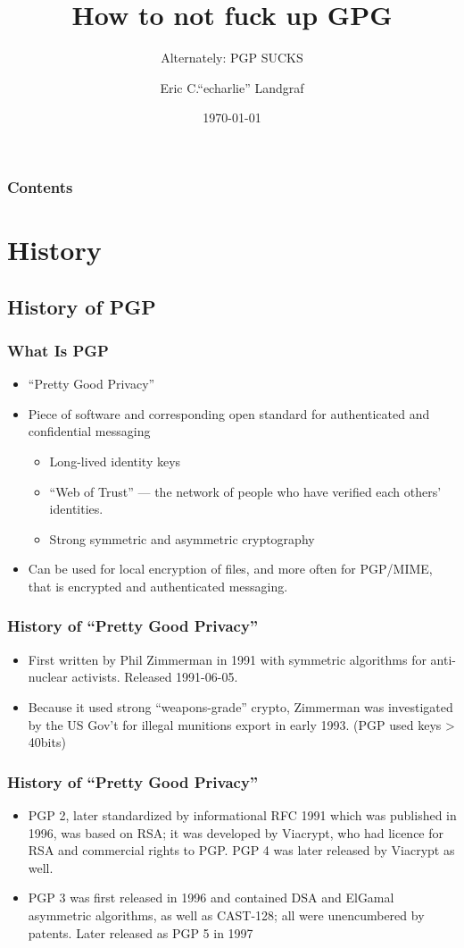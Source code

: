 \documentclass[aspectratio=1610,bigger,utf8]{beamer}
\title{How to not fuck up GPG}
\subtitle{Alternately: PGP SUCKS}
\author{Eric C.``echarlie'' Landgraf}
\institute{VTLUUG}
\date{\today}
\begin{document}
\frame{\titlepage}

\begin{frame}
	\frametitle{Contents}
	\tableofcontents[hideallsubsections]

\end{frame}

\section{History}
\subsection{History of PGP}
\begin{frame}
	\frametitle{What Is PGP}
	\begin{itemize}
		\item ``Pretty Good Privacy''
		\item Piece of software and corresponding open standard for
			authenticated and confidential messaging
			\begin{itemize}
				\item Long-lived identity keys
				\item ``Web of Trust'' --- the network of
					people who have verified each others'
					identities.
				\item Strong symmetric and asymmetric
					cryptography
			\end{itemize}
		\item Can be used for local encryption of files, and more often
			for PGP/MIME, that is encrypted and authenticated
			messaging.
	\end{itemize}
\end{frame}
\begin{frame}
	\frametitle{History of ``Pretty Good Privacy''}
	\begin{itemize}
		\item First written by Phil Zimmerman in 1991 with symmetric
			algorithms for anti-nuclear activists. Released
			1991-06-05.
		\item Because it used strong ``weapons-grade'' crypto,
			Zimmerman was investigated by the US Gov't for illegal
			munitions export in early 1993. (PGP used keys >
			40bits)
	\end{itemize}
\end{frame}
\begin{frame}
	\frametitle{History of ``Pretty Good Privacy''}
	\begin{itemize}
		\item PGP 2, later standardized by informational \alert{RFC
			1991} which was published in 1996, was based on RSA; it
			was developed by Viacrypt, who had licence for RSA and
			commercial rights to PGP. PGP 4 was later released by
			Viacrypt as well.
		\item PGP 3 was first released in 1996 and contained DSA and
			ElGamal asymmetric algorithms, as well as CAST-128; all
			were unencumbered by patents. Later released as PGP 5
			in 1997
	\end{itemize}
\end{frame}
\end{document}
